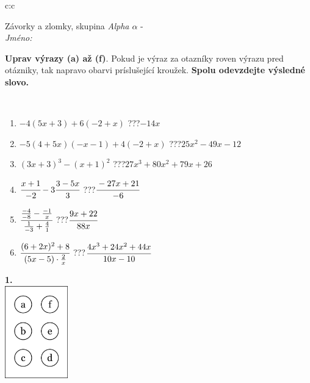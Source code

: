 \documentclass[10pt]{report}
\begin{document}
\thispagestyle{empty}
\begin{tabular}{c:c}
\begin{minipage}[c][104.5mm][t]{0.5\linewidth}
\begin{center}
\vspace{7mm}
{\huge Závorky a zlomky, skupina \textit{Alpha $\alpha$} -}\\[5mm]
\textit{Jméno:}\phantom{xxxxxxxxxxxxxxxxxxxxxxxxxxxxxxxxxxxxxxxxxxxxxxxxxxxxxxxxxxxxxxxxx}\\[5mm]
\begin{minipage}{0.95\linewidth}
\begin{center}
\textbf{Uprav výrazy (a) až (f)}. Pokud je výraz za otazníky roven výrazu pred otázniky, tak napravo obarvi príslušející kroužek. \textbf{Spolu odevzdejte výsledné slovo.}
\end{center}
\end{minipage}
\\[1mm]
\begin{minipage}{0.79\linewidth}
\begin{center}
\begin{varwidth}{\linewidth}
\begin{enumerate}
\normalsize
\item $-4(5x+3)+6(-2+x)$\quad \dotfill\; ???\;\dotfill \quad $-14x$
\item $-5(4+5x)(-x-1)+4(-2+x)$\quad \dotfill\; ???\;\dotfill \quad $25x^2-49x-12$
\item $(3x+3)^3-(x+1)^2$\quad \dotfill\; ???\;\dotfill \quad $27x^3+80x^2+79x+26$
\item $\cfrac{x+1}{-2}-3\cfrac{3-5x}{3}$\quad \dotfill\; ???\;\dotfill \quad $\cfrac{-27x+21}{-6}$
\item $\cfrac{\frac{-4}{-8}-\frac{-1}{x}}{\frac{1}{-3}+\frac{4}{1}}$\quad \dotfill\; ???\;\dotfill \quad $\cfrac{9x+22}{88x}$
\item $\cfrac{(6+2x)^2+8}{(5x-5)\cdot\frac{2}{x}}$\quad \dotfill\; ???\;\dotfill \quad $\cfrac{4x^3+24x^2+44x}{10x-10}$
\end{enumerate}
\end{varwidth}
\end{center}
\end{minipage}
\begin{minipage}{0.20\linewidth}
\begin{center}
{\Huge\bfseries 1.} \\[2mm]
\includegraphics[height=40mm]{../images/braille.png}

\end{center}
\end{minipage}
\end{center}
\end{minipage}
\end{tabular}
\end{document}
